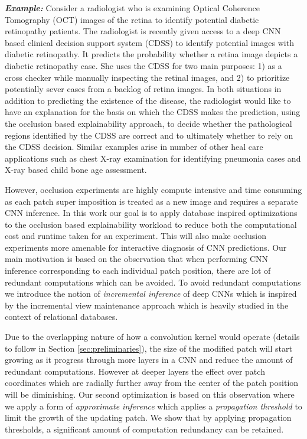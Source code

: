 \textbf{\textit{Example:}} Consider a radiologist who is examining Optical Coherence Tomography (OCT) images of the retina to identify potential diabetic retinopathy patients.
The radiologist is recently given access to a deep CNN based clinical decision support system (CDSS) to identify potential images with diabetic retinopathy. 
It predicts the probability whether a retina image depicts a diabetic retinopathy case.
She uses the CDSS for two main purposes: 1) as a cross checker while manually inspecting the retinal images, and 2) to prioritize potentially sever cases from a backlog of retina images.
In both situations in addition to predicting the existence of the disease, the radiologist would like to have an explanation for the basis on which the CDSS makes the prediction, using the occlusion based explainability approach, to decide whether the pathological regions identified by the CDSS are correct and to ultimately whether to rely on the CDSS decision. Similar examples arise in number of other heal care applications such as chest X-ray examination for identifying pneumonia cases and X-ray based child bone age assessment.

However, occlusion experiments are highly compute intensive and time consuming as each patch super imposition is treated as a new image and requires a separate CNN inference.
In this work our goal is to apply database inspired optimizations to the occlusion based explainability workload to reduce both the computational cost and runtime taken for an experiment.
This will also make occlusion experiments more amenable for interactive diagnosis of CNN predictions.
Our main motivation is based on the observation that when performing CNN inference corresponding to each individual patch position, there are lot of redundant computations which can be avoided.
To avoid redundant computations we introduce the notion of \textit{incremental inference} of deep CNNs which is inspired by the incremental view maintenance approach which is heavily studied in the context of relational databases.

Due to the overlapping nature of how a convolution kernel would operate (details to follow in Section \ref{sec:preliminaries}), the size of the modified patch will start growing as it progress through more layers in a CNN and reduce the amount of redundant computations.
However at deeper layers the effect over patch coordinates which are radially further away from the center of the patch position will be diminishing.
Our second optimization is based on this observation where we apply a form of \textit{approximate inference} which applies a \textit{propagation threshold} to limit the growth of the updating patch.
We show that by applying propagation thresholds, a significant amount of computation redundancy can be retained.

